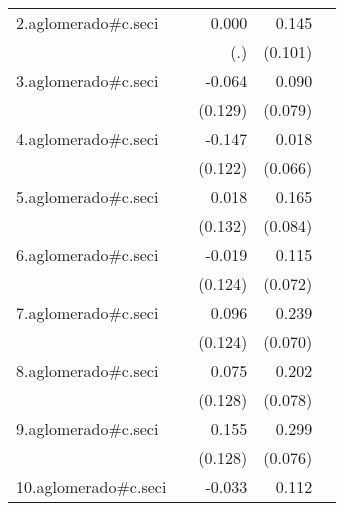 {\begin{longtable}{l*{4}{D{.}{.}{-1}}}
\addlinespace
2.aglomerado#c.seci&                     &       0.000         &       0.145         &                     \\
            &                     &         (.)         &     (0.101)         &                     \\
\addlinespace
3.aglomerado#c.seci&                     &      -0.064         &       0.090         &                     \\
            &                     &     (0.129)         &     (0.079)         &                     \\
\addlinespace
4.aglomerado#c.seci&                     &      -0.147         &       0.018         &                     \\
            &                     &     (0.122)         &     (0.066)         &                     \\
\addlinespace
5.aglomerado#c.seci&                     &       0.018         &       0.165\sym{*}  &                     \\
            &                     &     (0.132)         &     (0.084)         &                     \\
\addlinespace
6.aglomerado#c.seci&                     &      -0.019         &       0.115         &                     \\
            &                     &     (0.124)         &     (0.072)         &                     \\
\addlinespace
7.aglomerado#c.seci&                     &       0.096         &       0.239\sym{***}&                     \\
            &                     &     (0.124)         &     (0.070)         &                     \\
\addlinespace
8.aglomerado#c.seci&                     &       0.075         &       0.202\sym{**} &                     \\
            &                     &     (0.128)         &     (0.078)         &                     \\
\addlinespace
9.aglomerado#c.seci&                     &       0.155         &       0.299\sym{***}&                     \\
            &                     &     (0.128)         &     (0.076)         &                     \\
\addlinespace
10.aglomerado#c.seci&                     &      -0.033         &       0.112         &                     \\

\end{longtable}}
